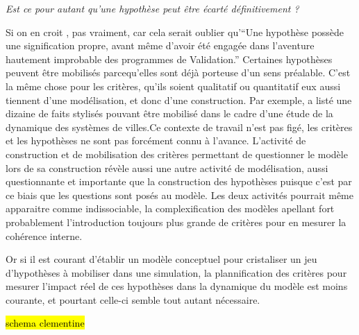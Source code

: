 \textit{Est ce pour autant qu'une hypothèse peut être écarté définitivement ?}

Si on en croit \textcite[17]{Besse2000}, pas vraiment, car cela serait oublier qu'\enquote{Une hypothèse possède une signification propre, avant même d’avoir été engagée dans l’aventure hautement improbable des programmes de Validation.} Certaines hypothèses peuvent être mobilisés parcequ'elles sont déjà porteuse d'un sens préalable. C'est la même chose pour les critères, qu'ils soient qualitatif ou quantitatif eux aussi tiennent d'une modélisation, et donc d'une construction. Par exemple, \textcite[80]{Schmitt2014} a listé une dizaine de faits stylisés pouvant être mobilisé dans le cadre d'une étude de la dynamique des systèmes de villes.Ce contexte de travail n'est pas figé, les critères et les hypothèses ne sont pas forcément connu à l'avance. L'activité de construction et de mobilisation des critères permettant de questionner le modèle lors de sa construction révèle aussi une autre activité de modélisation, aussi questionnante et importante que la construction des hypothèses puisque c'est par ce biais que les questions sont posés au modèle. Les deux activités pourrait même apparaitre comme indissociable, la complexification des modèles apellant fort probablement l'introduction toujours plus grande de critères pour en mesurer la cohérence interne.

Or si il est courant d'établir un modèle conceptuel pour cristaliser un jeu d'hypothèses à mobiliser dans une simulation, la plannification des critères pour mesurer l'impact réel de ces hypothèses dans la dynamique du modèle est moins courante, et pourtant celle-ci semble tout autant nécessaire. 

\hl{schema clementine}


